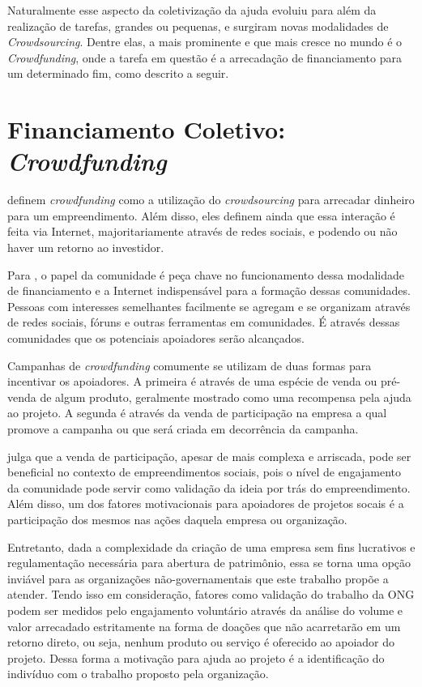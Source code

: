 Naturalmente esse aspecto da coletivização da ajuda evoluiu para além da realização de tarefas, grandes ou pequenas, e surgiram novas modalidades de \emph{Crowdsourcing}. Dentre elas, a mais prominente e que mais cresce no mundo é o \emph{Crowdfunding}, onde a tarefa em questão é a arrecadação de financiamento para um determinado fim, como descrito a seguir.



\section{Financiamento Coletivo: \emph{Crowdfunding}} \label{sec:fundamentacao:financiamento}
\citeauthor{belleflamme2010} definem \emph{crowdfunding} como a utilização do \emph{crowdsourcing} para arrecadar dinheiro para um empreendimento. Além disso, eles definem ainda que essa interação é feita via Internet, majoritariamente através de redes sociais, e podendo ou não haver um retorno ao investidor.

Para \citeauthor{golan2015crowdfunding}, o papel da comunidade é peça chave no funcionamento dessa modalidade de financiamento e a Internet indispensável para a formação dessas comunidades. Pessoas com interesses semelhantes facilmente se agregam e se organizam através de redes sociais, fóruns e outras ferramentas em comunidades. É através dessas comunidades que os potenciais apoiadores serão alcançados.

Campanhas de \emph{crowdfunding} comumente se utilizam de duas formas para incentivar os apoiadores\cite{belleflamme2014crowdfunding}. A primeira é através de uma espécie de venda ou pré-venda de algum produto, geralmente mostrado como uma recompensa pela ajuda ao projeto. A segunda é através da venda de participação na empresa a qual promove a campanha ou que será criada em decorrência da campanha.

\citeauthor{lehner2013crowdfunding} julga que a venda de participação, apesar de mais complexa e arriscada, pode ser beneficial no contexto de empreendimentos sociais, pois o nível de engajamento da comunidade pode servir como validação da ideia por trás do empreendimento. Além disso, um dos fatores motivacionais para apoiadores de projetos socais é a participação dos mesmos nas ações daquela empresa ou organização.

Entretanto, dada a complexidade da criação de uma empresa sem fins lucrativos e regulamentação necessária para abertura de patrimônio, essa se torna uma opção inviável para as organizações não-governamentais que este trabalho propõe a atender. Tendo isso em consideração, fatores como validação do trabalho da ONG podem ser medidos pelo engajamento voluntário através da análise do volume e valor arrecadado estritamente na forma de doações que não acarretarão em um retorno direto, ou seja, nenhum produto ou serviço é oferecido ao apoiador do projeto. Dessa forma a motivação para ajuda ao projeto é a identificação do indivíduo com o trabalho proposto pela organização.

